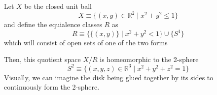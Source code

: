     \begin{example}[2-Sphere]
      Let $X$ be the closed unit ball 
      \begin{equation}
        X \equiv \{(x, y) \in \mathbb{R}^2 \mid x^2 + y^2 \leq 1\}
      \end{equation}
      and define the equialence classes $R$ as 
      \begin{equation}
        R \equiv \big\{ \{(x, y)\} \mid x^2 + y^2 <1 \big\} \cup \{S^1\}
      \end{equation}
      which will consist of open sets of one of the two forms
      \begin{center}
      \end{center}
      Then, this quotient space $X / R$ is homeomorphic to the 2-sphere
      \begin{equation}
        S^2 \equiv \{(x, y, z) \in \mathbb{R}^3 \mid x^2 + y^2 + z^2 = 1\}
      \end{equation}
      Visually, we can imagine the disk being glued together by its sides to continuously form the 2-sphere. 
    \end{example}

